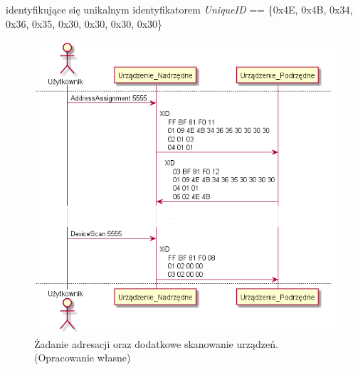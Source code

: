 identyfikujące się unikalnym identyfikatorem \textit{UniqueID} == \{0x4E, 0x4B, 0x34, 0x36, 0x35, 0x30, 0x30, 0x30, 0x30\}
\begin{figure}[h!]
    \centering
    \includegraphics[scale=0.75]{out/Diagramy/UML_DiagramOfSequence_New/UML_DiagramOfSequence_New-page2.png}
    \caption{Żadanie adresacji oraz dodatkowe skanowanie urządzeń.
        \newline(Opracowanie własne)}
    \label{fig:DiagramSequence_AddressAssignment_SecondDeviceScan}
\end{figure}
